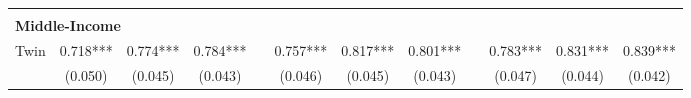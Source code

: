 \begin{landscape}
\begin{table}[htpb!]
\begin{center}
\begin{tabular}{lcccp{2mm}cccp{2mm}ccc}
\begin{footnotesize}\end{footnotesize}&\begin{footnotesize}\end{footnotesize}&\begin{footnotesize}\end{footnotesize}&\begin{footnotesize}\end{footnotesize}&\begin{footnotesize}\end{footnotesize}&\begin{footnotesize}\end{footnotesize}&\begin{footnotesize}\end{footnotesize}&\begin{footnotesize}\end{footnotesize}&\begin{footnotesize}\end{footnotesize}&\begin{footnotesize}\end{footnotesize}&\begin{footnotesize}\end{footnotesize}&\begin{footnotesize}\end{footnotesize}\\\multicolumn{12}{l}{\textbf{Middle-Income}}\\ 
Twin&0.718***&0.774***&0.784***&&0.757***&0.817***&0.801***&&0.783***&0.831***&0.839***\\
&(0.050)&(0.045)&(0.043)&&(0.046)&(0.045)&(0.043)&&(0.047)&(0.044)&(0.042)\\

\end{tabular}
\end{center}
\end{table}
\end{landscape}
